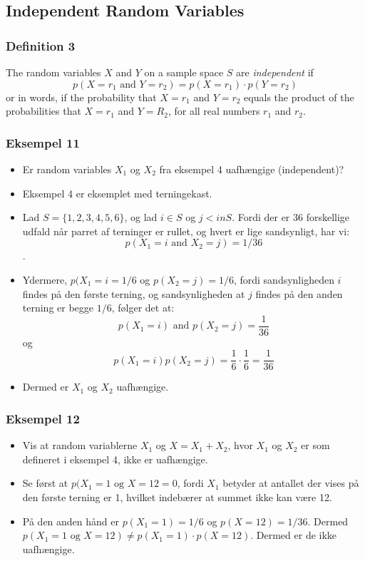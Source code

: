 \documentclass{beamer}
\begin{document}
\subsection{Independent Random Variables}
\label{subsec:indeprandvar}

\begin{frame}
  \frametitle{Definition 3}

  \begin{definition}[Definition 3]
    The random variables $X$ and $Y$ on a sample space $S$ are \textit{independent} if
    \[ p(X=r_{1} \text{ and } Y = r_{2}) = p(X=r_{1}) \cdot p(Y = r_{2}) \]
    or in words, if the probability that $X=r_{1}$ and $Y=r_{2}$ equals the product of the probabilities that $X = r_{1}$ and $Y = R_{2}$, for all real numbers $r_{1}$ and $r_{2}$.
  \end{definition}
\end{frame}

\begin{frame}[allowframebreaks]
  \frametitle{Eksempel 11}
  \begin{itemize}
  \item Er random variables $X_{1}$ og $X_2$ fra eksempel 4 uafhængige (independent)?
  \item Eksempel 4 er eksemplet med terningekast.
  \item Lad $S = \{1,2,3,4,5,6\}$, og lad $i \in S$ og $j <in S$. Fordi der er $36$ forskellige udfald når parret af terninger er rullet, og hvert er lige sandsynligt, har vi:
    \[ p(X_{1}=i \text{ and } X_{2} =j) = 1/36 \].
  \item Ydermere, $p(X_{1}=i = 1/6$ og $p(X_{2}=j) = 1/6$, fordi sandsynligheden $i$ findes på den første terning, og sandsynligheden at $j$ findes på den anden terning er begge $1/6$, følger det at:
    \[ p(X_{1} = i) \text{ and } p(X_{2}=j) = \frac{1}{36} \]
    og
    \[p(X_{1} = i)p(X_{2}=j) = \frac{1}{6}\cdot \frac{1}{6} = \frac{1}{36} \]
  \item Dermed er $X_1$ og $X_{2}$ uafhængige.
  \end{itemize}
\end{frame}

\begin{frame}[allowframebreaks]
  \frametitle{Eksempel 12}
  \begin{itemize}
  \item Vis at random variablerne $X_1$ og $X = X_{1} + X_{2}$, hvor $X_{1}$ og $X_{2}$ er som defineret i eksempel 4, ikke er uafhængige. 
  \item Se først at $p(X_{1} = 1 \text{ og } X = 12 = 0$, fordi $X_{1}$ betyder at antallet der vises på den første terning er 1, hvilket indebærer at summet ikke kan være 12. 
  \item På den anden hånd er $p(X_{1}=1)=1/6$ og $p(X=12) = 1/36$. Dermed $p(X_{1}=1 \text{ og } X = 12) \neq p(X_{1} =1) \cdot p(X=12)$. Dermed er de ikke uafhængige.
  \end{itemize}
\end{frame}
\end{document}
